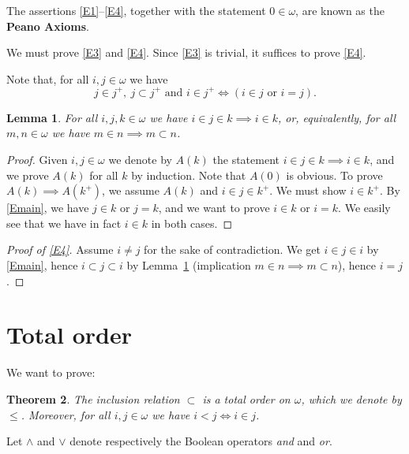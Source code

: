 \documentclass[12pt,letterpaper]{article}
\newtheorem{thm}{Theorem}%
\newtheorem{lem}[thm]{Lemma} %
\begin{document}
The assertions \eqref{E1}--\eqref{E4}, together with the statement \(0\in\omega\), are known as the \textbf{Peano Axioms}. 

We must prove \eqref{E3} and \eqref{E4}. Since \eqref{E3} is trivial, it suffices to prove \eqref{E4}. 

Note that, for all \(i,j\in\omega\) we have 
\begin{equation}\label{Emain}
j\in j^+,\ j\subset j^+\text{ and }i\in j^+\iff (i\in j\text{ or }i=j). 
\end{equation} 

\begin{lem}\label{Lmain} 
For all \(i,j,k\in\omega\) we have \(i\in j\in k\implies i\in k\), or, equivalently, for all \(m,n\in\omega\) we have \(m\in n\implies m\subset n\). 
\end{lem} 
\begin{proof} 
Given \(i,j\in\omega\) we denote by \(A(k)\) the statement \(i\in j\in k\implies i\in k\), and we prove \(A(k)\) for all \(k\) by induction. Note that \(A(0)\) is obvious. To prove \(A(k)\implies A(k^+)\), we assume \(A(k)\) and \(i\in j\in k^+\). We must show \(i\in k^+\). By \eqref{Emain}, we have \(j\in k\) or \(j=k\), and we want to prove \(i\in k\) or \(i=k\). We easily see that we have in fact \(i\in k\) in both cases. 
\end{proof} 

\begin{proof}[Proof of \eqref{E4}] 
Assume \(i\ne j\) for the sake of contradiction. We get \(i\in j\in i\) by \eqref{Emain}, hence \(i\subset j\subset i\) by Lemma~\ref{Lmain} (implication \(m\in n\implies m\subset n\)), hence \(i=j\). 
\end{proof} 

\section{Total order} %

We want to prove: 
\begin{thm}\label{Torder} 
The inclusion relation \(\subset\) is a total order on \(\omega\), which we denote by \(\le\). Moreover, for all \(i,j\in\omega\) we have \(i<j\iff i\in j\). 
\end{thm} 

Let \(\land\) and \(\lor\) denote respectively the Boolean operators \emph{and} and \emph{or}. 
\end{document}

